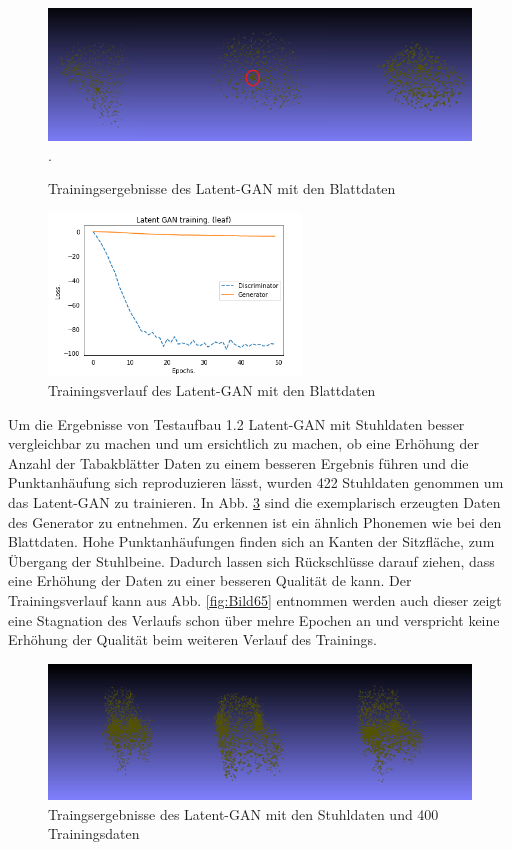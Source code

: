 \documentclass{llncs}
\begin{document}
\begin{figure}[htbp] 
	\centering
	\includegraphics[width=1.0\textwidth]{latent_gan_leaf_example.png}.
	\caption{Trainingsergebnisse des Latent-GAN mit den Blattdaten}
	\label{fig:Bild64}
\end{figure}
\begin{figure}[htbp] 
	\centering
	\includegraphics[width=0.6\textwidth]{Latent_gan_training_result.png}
	\caption{Trainingsverlauf des Latent-GAN mit den Blattdaten}
	\label{fig:Bild63}
\end{figure}
\pagebreak\linebreak 
Um die Ergebnisse von Testaufbau 1.2 Latent-GAN mit Stuhldaten besser vergleichbar zu machen und um ersichtlich zu machen, ob eine Erhöhung der Anzahl der Tabakblätter Daten zu einem besseren Ergebnis führen  und die Punktanhäufung sich reproduzieren lässt, wurden 422 Stuhldaten genommen um das Latent-GAN zu trainieren. In Abb. \ref{fig:Bild66} sind die exemplarisch erzeugten Daten des Generator zu entnehmen. Zu erkennen ist ein ähnlich Phonemen wie bei den Blattdaten. Hohe Punktanhäufungen finden sich an Kanten der Sitzfläche, zum Übergang der Stuhlbeine. Dadurch lassen sich Rückschlüsse darauf ziehen, dass eine Erhöhung der Daten zu einer besseren Qualität de kann. Der Trainingsverlauf kann aus Abb. \ref{fig:Bild65} entnommen werden auch dieser zeigt eine Stagnation des Verlaufs schon über mehre Epochen an und verspricht keine Erhöhung der Qualität beim weiteren Verlauf des Trainings.
\begin{figure}[htbp] 
	\centering
	\includegraphics[width=1.0\textwidth]{raw_gan_latent_gan_chair_example_400.png}
	\caption{Traingsergebnisse des Latent-GAN mit den Stuhldaten und 400 Trainingsdaten}
	\label{fig:Bild66}
\end{figure}
\end{document}
